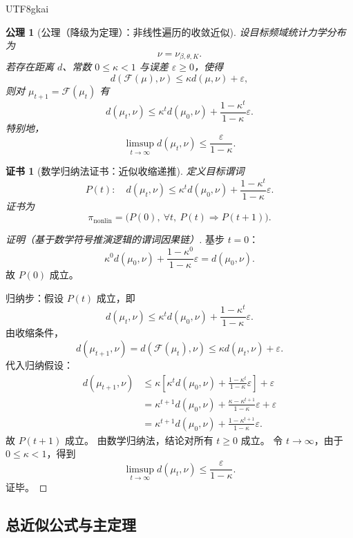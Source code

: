 \documentclass[12pt]{article}
\newtheorem{axiom}{公理}[section]
\newtheorem{Certificate}{证书}[section]
\begin{document}
\begin{CJK*}{UTF8}{gkai}
\begin{axiom}[公理（降级为定理）：非线性遍历的收敛近似]
\label{ax:tex55-nonlinear-contraction}
设目标频域统计力学分布为
\[
  \nu=\nu_{\beta,\theta,K}.
\]
若存在距离 \(d\)、常数 \(0\le\kappa<1\) 与误差 \(\varepsilon\ge0\)，使得
\[
  d(\mathcal F(\mu),\nu)
  \le
  \kappa d(\mu,\nu)+\varepsilon,
\]
则对 \(\mu_{t+1}=\mathcal F(\mu_t)\) 有
\[
  d(\mu_t,\nu)
  \le
  \kappa^t d(\mu_0,\nu)
  +
  \frac{1-\kappa^t}{1-\kappa}\varepsilon.
\]
特别地，
\[
  \limsup_{t\to\infty}d(\mu_t,\nu)
  \le
  \frac{\varepsilon}{1-\kappa}.
\]
\end{axiom}

\begin{Certificate}[数学归纳法证书：近似收缩递推]
\label{cert:tex55-nonlinear-contraction}
定义目标谓词
\[
  P(t):\quad
  d(\mu_t,\nu)
  \le
  \kappa^t d(\mu_0,\nu)
  +
  \frac{1-\kappa^t}{1-\kappa}\varepsilon.
\]
证书为
\[
  \pi_{\mathrm{nonlin}}
  =
  \bigl(P(0),\ \forall t,\ P(t)\Rightarrow P(t+1)\bigr).
\]
\end{Certificate}

\begin{proof}[证明（基于数学符号推演逻辑的谓词因果链）]
基步 \(t=0\)：
\[
  \kappa^0d(\mu_0,\nu)
  +
  \frac{1-\kappa^0}{1-\kappa}\varepsilon
  =
  d(\mu_0,\nu).
\]
故 \(P(0)\) 成立。

归纳步：假设 \(P(t)\) 成立，即
\[
  d(\mu_t,\nu)
  \le
  \kappa^t d(\mu_0,\nu)
  +
  \frac{1-\kappa^t}{1-\kappa}\varepsilon.
\]
由收缩条件，
\[
  d(\mu_{t+1},\nu)
  =
  d(\mathcal F(\mu_t),\nu)
  \le
  \kappa d(\mu_t,\nu)+\varepsilon.
\]
代入归纳假设：
\[
\begin{aligned}
  d(\mu_{t+1},\nu)
  &\le
  \kappa
  \left[
  \kappa^t d(\mu_0,\nu)
  +
  \frac{1-\kappa^t}{1-\kappa}\varepsilon
  \right]
  +
  \varepsilon\\
  &=
  \kappa^{t+1}d(\mu_0,\nu)
  +
  \frac{\kappa-\kappa^{t+1}}{1-\kappa}\varepsilon
  +
  \varepsilon\\
  &=
  \kappa^{t+1}d(\mu_0,\nu)
  +
  \frac{1-\kappa^{t+1}}{1-\kappa}\varepsilon.
\end{aligned}
\]
故 \(P(t+1)\) 成立。
由数学归纳法，结论对所有 \(t\ge0\) 成立。
令 \(t\to\infty\)，由于 \(0\le\kappa<1\)，得到
\[
  \limsup_{t\to\infty}d(\mu_t,\nu)
  \le
  \frac{\varepsilon}{1-\kappa}.
\]
证毕。
\end{proof}

\subsection{总近似公式与主定理}
\label{subsec:tex55-total-bridge}


\end{CJK*}
\end{document}
